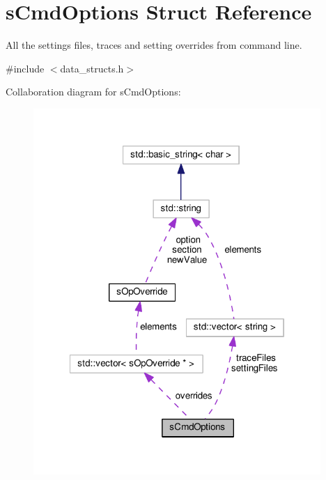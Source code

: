 \hypertarget{structsCmdOptions}{\section{s\-Cmd\-Options \-Struct \-Reference}
\label{d2/db8/structsCmdOptions}
}


\-All the settings files, traces and setting overrides from command line.  




{\ttfamily \#include $<$data\-\_\-structs.\-h$>$}



\-Collaboration diagram for s\-Cmd\-Options\-:\nopagebreak
\begin{figure}[H]
\begin{center}
\leavevmode
\includegraphics[width=309pt]{d0/de9/structsCmdOptions__coll__graph}
\end{center}
\end{figure}
